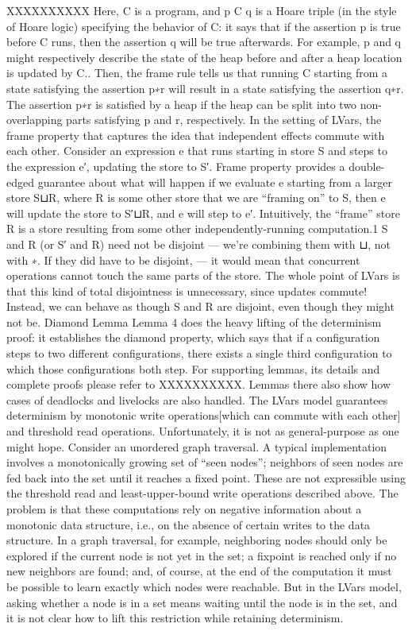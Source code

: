 \documentclass[twocolumn]{article}
\begin{document}
XXXXXXXXXX
Here, C is a program, and {p} C {q} is a Hoare triple (in the style of Hoare logic) specifying the behavior of C: it says that if the assertion p  is true before C  runs, then the assertion q  will be true afterwards. For example, p and q  might respectively describe the state of the heap before and after a heap location is updated by C.. Then, the frame rule tells us that running C starting from a state satisfying the assertion p∗r will result in a state satisfying the assertion q∗r. The assertion p∗r is satisfied by a heap if the heap can be split into two non-overlapping parts satisfying p and r, respectively.
In the setting of LVars, the frame property that captures the idea that independent effects commute with each other. Consider an expression e that runs starting in store S  and steps to the expression e′, updating the store to S′. Frame property provides a double-edged guarantee about what will happen if we evaluate e starting from a larger store S⊔R, where R is some other store that we are “framing on” to S, then e  will update the store to S′⊔R, and e will step to e′. Intuitively, the “frame” store R  is a store resulting from some other independently-running computation.1
S and R (or S′ and R) need not be disjoint — we’re combining them with ⊔, not with ∗. If they did have to be disjoint,  — it would mean that concurrent operations cannot touch the same parts of the store. The whole point of LVars is that this kind of total disjointness is unnecessary, since updates commute! Instead, we can behave as though S and R are disjoint, even though they might not be. 
Diamond Lemma
Lemma 4 does the heavy lifting of the determinism proof: it establishes the diamond property, which says that if a configuration steps to two different configurations, there exists a single third configuration to which those configurations both step. 
For supporting lemmas, its details and complete proofs please refer to XXXXXXXXXX. Lemmas there also show  how cases of deadlocks and livelocks are also handled.
The LVars model guarantees determinism by monotonic write operations[which can commute with each other] and threshold read operations. Unfortunately, it is not as general-purpose as one might hope. Consider an unordered graph traversal. A typical implementation involves a monotonically growing set of “seen nodes”; neighbors of seen nodes are fed back into the set until it reaches a fixed point. These are not expressible using the threshold read and least-upper-bound write operations described above. The problem is that these computations rely on negative information about a monotonic data structure, i.e., on the absence of certain writes to the data structure. In a graph traversal, for example, neighboring nodes should only be explored if the current node is not yet in the set; a fixpoint is reached only if no new neighbors are found; and, of course, at the end of the computation it must be possible to learn exactly which nodes were reachable. But in the LVars model, asking whether a node is in a set means waiting until the node is in the set, and it is not clear how to lift this restriction while retaining determinism.
\end{document}
